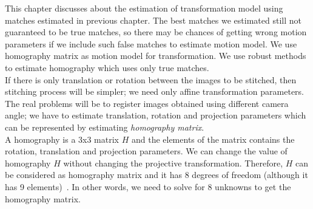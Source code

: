 This chapter discusses about the estimation of transformation model using matches estimated in previous chapter. The best matches we estimated still not guaranteed to be true matches, so there may be chances of getting wrong motion parameters if we include such false matches to estimate motion model. We use homography matrix as motion model for transformation. We use robust methods to estimate homography which uses only true matches.\\

\noindent If there is only translation or rotation between the images to be stitched, then stitching process will be simpler; we need only affine transformation parameters. The real problems will be to register images obtained using different camera angle; we have to estimate translation, rotation and projection parameters which can be represented by estimating \emph{homography matrix}.\\

\noindent A homography is a 3x3 matrix $H$ and the elements of the matrix contains the rotation, translation and projection parameters. We can change the value of homography $H$ without changing the projective transformation. Therefore, $H$ can be considered as homography matrix and it has 8 degrees of freedom (although it has 9 elements)~\cite{Dubrofsky:07}. In other words, we need to solve for 8 unknowns to get the homography matrix. 


